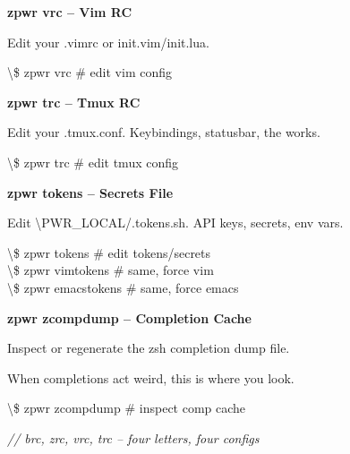 \documentclass[11pt,a4paper,twoside]{book}
\begin{document}
\vspace{12pt}
{\bfseries\color{neonyellow} zpwr vrc  -- Vim RC}\vspace{4pt}

Edit your .vimrc or init.vim/init.lua.

\begin{codebox}
\textbackslash{}\$ zpwr vrc                    \# edit vim config\\
\end{codebox}


\vspace{12pt}
{\bfseries\color{neonyellow} zpwr trc  -- Tmux RC}\vspace{4pt}

Edit your .tmux.conf. Keybindings, statusbar, the works.

\begin{codebox}
\textbackslash{}\$ zpwr trc                    \# edit tmux config\\
\end{codebox}


\vspace{12pt}
{\bfseries\color{neonyellow} zpwr tokens  -- Secrets File}\vspace{4pt}

Edit \textbackslash{}PWR\_LOCAL/.tokens.sh. API keys, secrets, env vars.

\begin{codebox}
\textbackslash{}\$ zpwr tokens                 \# edit tokens/secrets\\
\textbackslash{}\$ zpwr vimtokens              \# same, force vim\\
\textbackslash{}\$ zpwr emacstokens            \# same, force emacs\\
\end{codebox}


\vspace{12pt}
{\bfseries\color{neonyellow} zpwr zcompdump  -- Completion Cache}\vspace{4pt}

Inspect or regenerate the zsh completion dump file.

When completions act weird, this is where you look.

\begin{codebox}
\textbackslash{}\$ zpwr zcompdump              \# inspect comp cache\\
\end{codebox}

{\small\itshape\color{dimtext} // brc, zrc, vrc, trc -- four letters, four configs}
\end{document}
